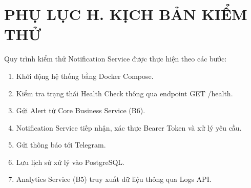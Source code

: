 \section*{PHỤ LỤC H. KỊCH BẢN KIỂM THỬ}

Quy trình kiểm thử Notification Service được thực hiện theo các bước:

\begin{enumerate}

\item Khởi động hệ thống bằng Docker Compose.

\item Kiểm tra trạng thái Health Check thông qua endpoint GET /health.

\item Gửi Alert từ Core Business Service (B6).

\item Notification Service tiếp nhận, xác thực Bearer Token và xử lý yêu cầu.

\item Gửi thông báo tới Telegram.

\item Lưu lịch sử xử lý vào PostgreSQL.

\item Analytics Service (B5) truy xuất dữ liệu thông qua Logs API.

\end{enumerate}
